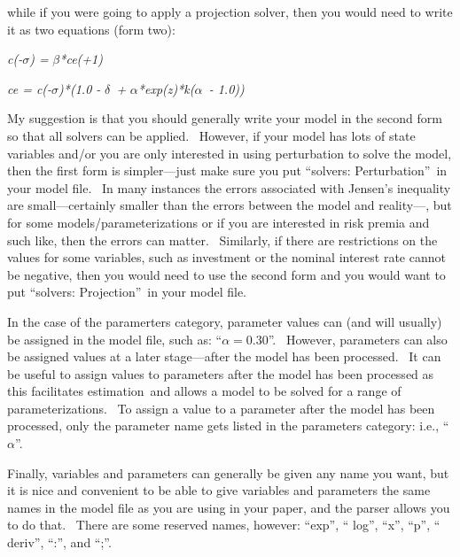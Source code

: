 \documentclass[notitlepage,11pt]{article}
\begin{document}
\bigskip

while if you were going to apply a projection solver, then you would need to
write it as two equations (form two):

\bigskip

\textit{c(-}$\sigma $\textit{) = }$\beta $\textit{*ce(+1)}

\textit{ce = c(-}$\sigma $\textit{)*(1.0 - }$\delta $\textit{\ + }%
$\alpha $\textit{*exp(z)*k(}$\alpha $\textit{\ - 1.0))}

\bigskip

My suggestion is that you should generally write your model in the second
form so that all solvers can be applied. \ However, if your model has lots
of state variables and/or you are only interested in using perturbation to
solve the model, then the first form is simpler---just make sure you put
\textquotedblleft solvers: Perturbation\textquotedblright\ in your model
file. \ In many instances the errors associated with Jensen's inequality are
small---certainly smaller than the errors between the model and reality---,
but for some models/parameterizations or if you are interested in risk
premia and such like, then the errors can matter. \ Similarly, if there are
restrictions on the values for some variables, such as investment or the
nominal interest rate cannot be negative, then you would need to use the
second form and you would want to put \textquotedblleft solvers:
Projection\textquotedblright\ in your model file.

In the case of the paramerters category, parameter values can (and will
usually) be assigned in the model file, such as: \textquotedblleft $\alpha
=0.30$\textquotedblright . \ However, parameters can also be assigned values
at a later stage---after the model has been processed. \ It can be useful to
assign values to parameters after the model has been processed as this
facilitates estimation\ and allows a model to be solved for a range of
parameterizations. \ To assign a value to a parameter after the model has
been processed, only the parameter name gets listed in the parameters
category: i.e., \textquotedblleft $\alpha $\textquotedblright .

Finally, variables and parameters can generally be given any name you want,
but it is nice and convenient to be able to give variables and parameters
the same names in the model file as you are using in your paper, and the
parser allows you to do that. \ There are some reserved names, however:
\textquotedblleft exp\textquotedblright , \textquotedblleft
log\textquotedblright , \textquotedblleft x\textquotedblright ,
\textquotedblleft p\textquotedblright , \textquotedblleft
deriv\textquotedblright , \textquotedblleft :\textquotedblright , and
\textquotedblleft ;\textquotedblright .
\end{document}
